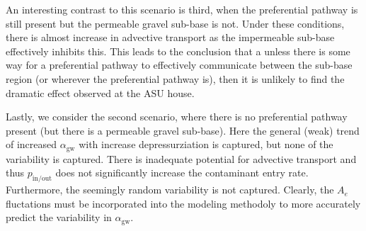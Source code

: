 \documentclass[journal=esthag,manuscript=article]{achemso}
\begin{document}
An interesting contrast to this scenario is third, when the preferential pathway is still present but the permeable gravel sub-base is not.
Under these conditions, there is almost increase in advective transport as the impermeable sub-base effectively inhibits this.
This leads to the conclusion that a unless there is some way for a preferential pathway to effectively communicate between the sub-base region (or wherever the preferential pathway is), then it is unlikely to find the dramatic effect observed at the ASU house.

Lastly, we consider the second scenario, where there is no preferential pathway present (but there is a permeable gravel sub-base).
Here the general (weak) trend of increased $\alpha_\mathrm{gw}$ with increase depressurziation is captured, but none of the variability is captured.
There is inadequate potential for advective transport and thus $p_\mathrm{in/out}$ does not significantly increase the contaminant entry rate.
Furthermore, the seemingly random variability is not captured.
Clearly, the $A_e$ fluctations must be incorporated into the modeling methodoly to more accurately predict the variability in $\alpha_\mathrm{gw}$.
\end{document}
